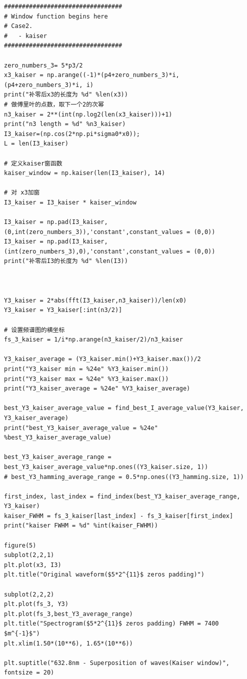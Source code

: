 \documentclass[conference]{IEEEtran}
\begin{document}
\begin{lstlisting}
#################################
# Window function begins here
# Case2.
#   - kaiser
#################################

zero_numbers_3= 5*p3/2
x3_kaiser = np.arange((-1)*(p4+zero_numbers_3)*i, (p4+zero_numbers_3)*i, i)
print("补零后x3的长度为 %d" %len(x3)) 
# 做傅里叶的点数，取下一个2的次幂
n3_kaiser = 2**(int(np.log2(len(x3_kaiser)))+1)
print("n3 length = %d" %n3_kaiser)
I3_kaiser=(np.cos(2*np.pi*sigma0*x0));
L = len(I3_kaiser)

# 定义kaiser窗函数
kaiser_window = np.kaiser(len(I3_kaiser), 14)

# 对 x3加窗
I3_kaiser = I3_kaiser * kaiser_window

I3_kaiser = np.pad(I3_kaiser,(0,int(zero_numbers_3)),'constant',constant_values = (0,0))
I3_kaiser = np.pad(I3_kaiser,(int(zero_numbers_3),0),'constant',constant_values = (0,0))
print("补零后I3的长度为 %d" %len(I3)) 



Y3_kaiser = 2*abs(fft(I3_kaiser,n3_kaiser))/len(x0)
Y3_kaiser = Y3_kaiser[:int(n3/2)]

# 设置频谱图的横坐标
fs_3_kaiser = 1/i*np.arange(n3_kaiser/2)/n3_kaiser

Y3_kaiser_average = (Y3_kaiser.min()+Y3_kaiser.max())/2
print("Y3_kaiser min = %24e" %Y3_kaiser.min())
print("Y3_kaiser max = %24e" %Y3_kaiser.max())
print("Y3_kaiser_average = %24e" %Y3_kaiser_average)

best_Y3_kaiser_average_value = find_best_I_average_value(Y3_kaiser, Y3_kaiser_average)
print("best_Y3_kaiser_average_value = %24e" %best_Y3_kaiser_average_value)

best_Y3_kaiser_average_range = best_Y3_kaiser_average_value*np.ones((Y3_kaiser.size, 1))
# best_Y3_hamming_average_range = 0.5*np.ones((Y3_hamming.size, 1))

first_index, last_index = find_index(best_Y3_kaiser_average_range, Y3_kaiser)
kaiser_FWHM = fs_3_kaiser[last_index] - fs_3_kaiser[first_index]
print("kaiser FWHM = %d" %int(kaiser_FWHM))

figure(5)
subplot(2,2,1)
plt.plot(x3, I3)
plt.title("Original waveform($5*2^{11}$ zeros padding)")

subplot(2,2,2)
plt.plot(fs_3, Y3)
plt.plot(fs_3,best_Y3_average_range)
plt.title("Spectrogram($5*2^{11}$ zeros padding) FWHM = 7400 $m^{-1}$")
plt.xlim(1.50*(10**6), 1.65*(10**6))

plt.suptitle("632.8nm - Superposition of waves(Kaiser window)", fontsize = 20)



\end{lstlisting}
\end{document}
